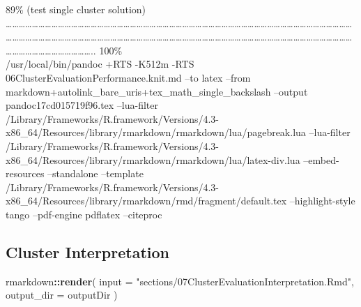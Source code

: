 \documentclass[
]{article}
\newenvironment{Shaded}{\begin{snugshade}}{\end{snugshade}}
\newcommand{\AttributeTok}[1]{\textcolor[rgb]{0.13,0.29,0.53}{#1}}
\newcommand{\FunctionTok}[1]{\textcolor[rgb]{0.13,0.29,0.53}{\textbf{#1}}}
\newcommand{\NormalTok}[1]{#1}
\newcommand{\SpecialCharTok}[1]{\textcolor[rgb]{0.81,0.36,0.00}{\textbf{#1}}}
\newcommand{\StringTok}[1]{\textcolor[rgb]{0.31,0.60,0.02}{#1}}
\begin{document}
\textbar{} 89\% (test single cluster solution) \textbar{}
\textbar\ldots\ldots\ldots\ldots\ldots\ldots\ldots\ldots\ldots\ldots\ldots\ldots\ldots\ldots\ldots\ldots\ldots\ldots\ldots\ldots\ldots\ldots\ldots\ldots\ldots\ldots\ldots\ldots\ldots\ldots\ldots\ldots\ldots\ldots\ldots\ldots\ldots\ldots\ldots\ldots\ldots\ldots\ldots\ldots\ldots\ldots\ldots\ldots\ldots\ldots\ldots\ldots\ldots\ldots\ldots\ldots\ldots\ldots\ldots\ldots\ldots\ldots\ldots\ldots\ldots\ldots\ldots\ldots\ldots\ldots\ldots\ldots\ldots\ldots\ldots\ldots\ldots\ldots\ldots\ldots\ldots\ldots\ldots\ldots\ldots\ldots\ldots\ldots\ldots\ldots\ldots\ldots\ldots\ldots\ldots\ldots\ldots\ldots\ldots\ldots\ldots\ldots\ldots\ldots\ldots\ldots\ldots\ldots\ldots\ldots\ldots\ldots\ldots\ldots\ldots\ldots\ldots\ldots\ldots..\textbar{}
100\%\\
/usr/local/bin/pandoc +RTS -K512m -RTS
06ClusterEvaluationPerformance.knit.md --to latex --from
markdown+autolink\_bare\_uris+tex\_math\_single\_backslash --output
pandoc17cd015719f96.tex --lua-filter
/Library/Frameworks/R.framework/Versions/4.3-x86\_64/Resources/library/rmarkdown/rmarkdown/lua/pagebreak.lua
--lua-filter
/Library/Frameworks/R.framework/Versions/4.3-x86\_64/Resources/library/rmarkdown/rmarkdown/lua/latex-div.lua
--embed-resources --standalone --template
/Library/Frameworks/R.framework/Versions/4.3-x86\_64/Resources/library/rmarkdown/rmd/fragment/default.tex
--highlight-style tango --pdf-engine pdflatex --citeproc

\hypertarget{cluster-interpretation}{%
\subsection{Cluster Interpretation}\label{cluster-interpretation}}

\begin{Shaded}
\begin{Highlighting}[]
\NormalTok{rmarkdown}\SpecialCharTok{::}\FunctionTok{render}\NormalTok{(}
  \AttributeTok{input =} \StringTok{"sections/07ClusterEvaluationInterpretation.Rmd"}\NormalTok{,}
  \AttributeTok{output\_dir =}\NormalTok{ outputDir}
\NormalTok{)}
\end{Highlighting}
\end{Shaded}
\end{document}
